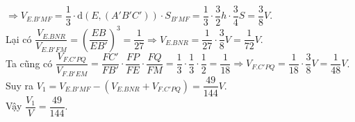 \begin{ex}
{\begin{itemize}
		\end{itemize}
		$\Rightarrow {V_{E.B'MF}}=\dfrac{1}{3}\cdot \mathrm{d}\left(E, (A'B'C')\right)\cdot{S_{B'MF}}=\dfrac{1}{3}\cdot \dfrac{3}{2}h\cdot \dfrac{3}{4}S=\dfrac{3}{8}V$.\\
		Lại có $\dfrac{V_{E.BNR}}{V_{E. B'FM}}=\left(\dfrac{EB}{EB'}\right)^3=\dfrac{1}{27}\Rightarrow {V_{E.BNR}}=\dfrac{1}{27}\cdot \dfrac{3}{8}V=\dfrac{1}{72}V$.\\
		Ta cũng có $\dfrac{V_{F.C'PQ}}{V_{F.B'EM}}=\dfrac{FC'}{FB'}\cdot \dfrac{FP}{FE}\cdot \dfrac{FQ}{FM}=\dfrac{1}{3}\cdot \dfrac{1}{3}\cdot \dfrac{1}{2}=\dfrac{1}{18}\Rightarrow {V_{F.C'PQ}}=\dfrac{1}{18}\cdot \dfrac{3}{8}V=\dfrac{1}{48}V$.\\
		Suy ra $V_1=V_{E.B'MF}-(V_{E.BNR}+V_{F.C'PQ})=\dfrac{49}{144}V$.\\
		Vậy $\dfrac{V_1}{V}=\dfrac{49}{144}$.
	}
\end{ex}
